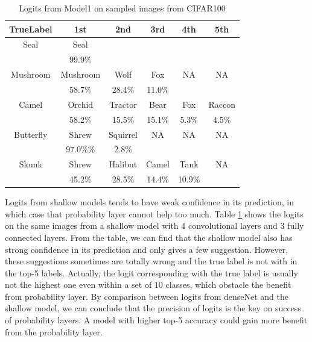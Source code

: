 \documentclass{article}
\begin{document}
\begin{table}
\begin{center}
\begin{tabular}{ |c|c|c|c|c|c| } 
 \hline
 TrueLabel & 1st & 2nd & 3rd & 4th & 5th \\
 \hline
 Seal   &   Seal  &      &    &  &  \\
        &   99.9\%          &      &      & & \\
 \hline
 Mushroom   &   Mushroom   & Wolf & Fox & NA & NA \\
            &   58.7\%  &   28.4\% &    11.0\%     &&\\
 \hline
 Camel  &   Orchid & Tractor & Bear & Fox & Raccon \\
        &   58.2\%  &   15.5\%   &   15.1\%   &   5.3\%   & 4.5\%  \\    
 \hline
 Butterfly  &   Shrew & Squirrel & NA & NA & NA \\
        &   97.0\%\%  &   2.8\%  &      &      &      \\
 \hline
 Skunk  &   Shrew   &   Halibut &   Camel   &   Tank    &   NA   \\
        &   45.2\%  &   28.5\%  &   14.4\%  &   10.9\%  &       \\
 \hline
\end{tabular}
\end{center}
\caption{Logits from Model1 on sampled images from CIFAR100}
\label{table:logitsSimple}
\end{table}
Logits from shallow models tends to have weak confidence in its prediction, in which case that probability layer cannot help too much. Table \ref{table:logitsSimple} shows the logits on the same images from a shallow model with $4$ convolutional layers and $3$ fully connected layers. From the table, we can find that the shallow model also has strong confidence in its prediction and only gives a few suggestion. However, these suggestions sometimes are totally wrong and the true label is not with in the top-5 labels. Actually, the logit corresponding with the true label is usually not the highest one even within a set of $10$ classes, which obstacle the benefit from probability layer. By comparison between logits from denseNet and the shallow model, we can conclude that the precision of logits is the key on success of probability layers. A model with higher top-5 accuracy could gain more benefit from the probability layer.
\end{document}
